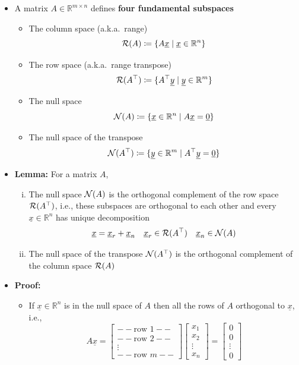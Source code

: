 \documentclass[11pt,twoside]{report}
\newcommand{\bbR}{{\mathbb{R}}}
\newcommand{\vecnot}{\underline}
\begin{document}
\begin{itemize}

\item A matrix $A \in \bbR^{m \times n}$ defines \textbf{four fundamental subspaces} 
\begin{itemize}
\item The column space (a.k.a.\ range) 
\[
\cR(A)  \coloneqq \{ A \vecnot{x} \mid \vecnot{x} \in \bbR^n  \} 
\]
\item The row space (a.k.a.\ range transpose) 
\[
\cR(A^\top )  \coloneqq \{ A^\top  \vecnot{y} \mid \vecnot{y} \in \bbR^m  \} 
\]
\item The null space 
\[
\cN(A)  \coloneqq \{ \vecnot{x} \in \bbR^n \mid A \vecnot{x} = \vecnot{0} \} 
\]
\item The null space of the transpose
\[
\cN(A^\top)  \coloneqq \{ \vecnot{y} \in \bbR^m \mid A^\top \vecnot{y} = \vecnot{0} \} 
\]
\end{itemize}


\item \textbf{Lemma:} For a matrix $A$, 
\begin{enumerate}[(i)]
\item The null space $\mathcal{N}(A)$ is the orthogonal complement of the row space $\mathcal{R}(A^\top)$, i.e., these subspaces are orthogonal to each other and  every $\vecnot{x} \in \bbR^n$ has unique decomposition 
\[
\vecnot{x} =  \vecnot{x}_r + \vecnot{x}_n \quad  \vecnot{x}_r \in \cR(A^\top)\quad  \vecnot{x}_n \in \cN(A)
\]
\item The null space of the transpose $\mathcal{N}(A^\top )$ is the orthogonal complement of the column space $\mathcal{R}(A)$%
\end{enumerate}

\item \textbf{Proof:}
\begin{itemize}
\item If $\vecnot{x} \in \mathbb{R}^n$ is in the null space of $A$  then all the rows of $A$ orthogonal to $\vecnot{x}$, i.e., 
\[ A \vecnot{x} = \begin{bmatrix} -- \text{row  $1$} -- \\ -- \text{row $2$} -- \\ \vdots \\ -- \text{row $m$} -- \end{bmatrix} \begin{bmatrix}x_1 \\ x_2 \\ \vdots \\ x_n \end{bmatrix} = \begin{bmatrix} 0 \\ 0 \\ \vdots \\ 0 \end{bmatrix} \]


\end{itemize}
\end{itemize}
\end{document}
